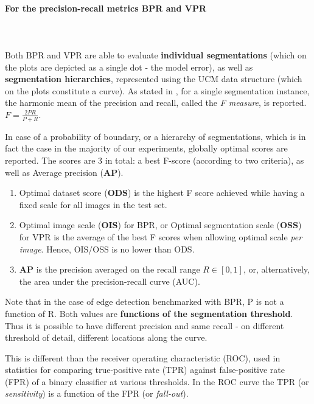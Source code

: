 \paragraph{For the precision-recall metrics BPR and VPR}\mbox{}\\\mbox{}\\
Both BPR and VPR are able to evaluate {\bf individual segmentations} (which on the plots are depicted as a single dot - the model error), as well as {\bf segmentation hierarchies}, represented using the UCM data structure (which on the plots constitute a curve). As stated in , for a single segmentation instance, the harmonic mean of the precision and recall, called the {\it F measure}, is reported. $F=\frac{2PR}{P+R}$.

In case of a probability of boundary, or a hierarchy of segmentations, which is in fact the case in the majority of our experiments, globally optimal scores %
are reported. The scores are 3 in total: a best F-score (according to two criteria), as well as Average precision (\textbf{AP}). 

\begin{enumerate}
 \item Optimal dataset score ({\bf ODS}) is the highest F score achieved while having a fixed scale for all images in the test set. 
 \item Optimal image scale ({\bf OIS}) for BPR, or Optimal segmentation scale (\textbf{OSS}) for VPR is the average of the best F scores when allowing optimal scale {\it per image}. Hence, OIS\slash OSS is no lower than ODS. 
 \item {\bf AP} is the precision averaged on the recall range $R\in[0,1]$, or, alternatively, the area under the precision-recall curve (AUC).
\end{enumerate}

Note that in the case of edge detection benchmarked with BPR, P is not a function of R. Both values are {\bf functions of the segmentation threshold}. Thus it is possible to have different precision and same recall - on different threshold of detail, \ie different locations along the curve.

This is different than %
the receiver operating characteristic (ROC), used in statistics for comparing true-positive rate (TPR) against false-positive rate (FPR) of a binary classifier at various thresholds. In the ROC curve the TPR (or {\it sensitivity}) 
is a function of the FPR (or {\it fall-out}).

